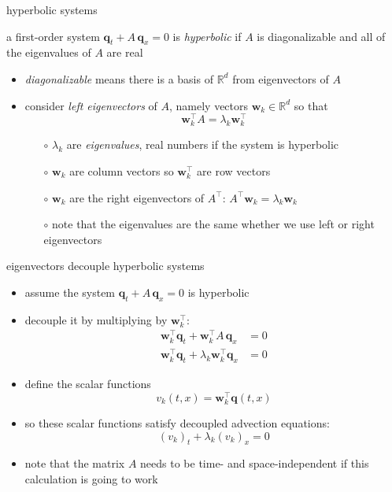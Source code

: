 \documentclass[10pt,hyperref]{beamer}
\newcommand{\bq}{\mathbf{q}}
\newcommand{\bw}{\mathbf{w}}
\newcommand{\RR}{\mathbb{R}}
\begin{document}
\begin{frame}{hyperbolic systems}

\begin{definition} a first-order system $\bq_t + A\, \bq_x=0$ is \emph{hyperbolic} if $A$ is diagonalizable and all of the eigenvalues of $A$ are real
\end{definition}

\begin{itemize}
\item \emph{diagonalizable} means there is a basis of $\RR^d$ from eigenvectors of $A$
\item consider \emph{left eigenvectors} of $A$, namely vectors $\bw_k \in \RR^d$ so that
    $$\bw_k^\top A = \lambda_k \bw_k^\top$$

\vspace{-2mm}
    \begin{itemize}
    \item[$\circ$] $\lambda_k$ are \emph{eigenvalues}, real numbers if the system is hyperbolic
    \item[$\circ$] $\bw_k$ are column vectors so $\bw_k^\top$ are row vectors
    \item[$\circ$] $\bw_k$ are the right eigenvectors of $A^\top$: \qquad $A^\top \bw_k = \lambda_k \bw_k$
    \item[$\circ$] note that the eigenvalues are the same whether we use left or right eigenvectors
    \end{itemize}
\end{itemize}
\end{frame}


\begin{frame}{eigenvectors decouple hyperbolic systems}

\begin{itemize}
\item assume the system $\bq_t + A\, \bq_x=0$ is hyperbolic
\item decouple it by multiplying by $\bw_k^\top$:
\begin{align*}
\bw_k^\top \bq_t + \bw_k^\top A\, \bq_x &= 0 \\
\bw_k^\top \bq_t + \lambda_k \bw_k^\top \bq_x &= 0
\end{align*}
\item define the scalar functions
    $$v_k(t,x) = \bw_k^\top \bq(t,x)$$
\item so these scalar functions satisfy decoupled advection equations:
   $$(v_k)_t + \lambda_k (v_k)_x = 0$$
\item note that the matrix $A$ needs to be time- and space-independent if this calculation is going to work
\end{itemize}
\end{frame}
\end{document}

